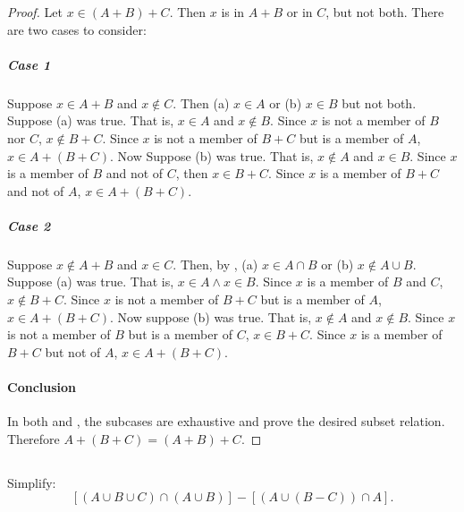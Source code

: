 \documentclass{report}
\begin{document}
\begin{proof}
    Let $x \in (A + B) + C$.
    Then $x$ is in $A + B$ or in $C$, but not both.
    There are two cases to consider:

    \subparagraph{Case 1}%

      Suppose $x \in A + B$ and $x \not\in C$.
      Then (a) $x \in A$ or (b) $x \in B$ but not both.
      Suppose (a) was true.
      That is, $x \in A$ and $x \not\in B$.
      Since $x$ is not a member of $B$ nor $C$, $x \not\in B + C$.
      Since $x$ is not a member of $B + C$ but is a member of $A$,
        $x \in A + (B + C)$.
      Now Suppose (b) was true.
      That is, $x \not\in A$ and $x \in B$.
      Since $x$ is a member of $B$ and not of $C$, then $x \in B + C$.
      Since $x$ is a member of $B + C$ and not of $A$, $x \in A + (B + C)$.

    \subparagraph{Case 2}%

      Suppose $x \not\in A + B$ and $x \in C$.
      Then, by ,
        (a) $x \in A \cap B$ or (b) $x \not\in A \cup B$.
      Suppose (a) was true.
      That is, $x \in A \land x \in B$.
      Since $x$ is a member of $B$ and $C$, $x \not\in B + C$.
      Since $x$ is not a member of $B + C$ but is a member of $A$,
        $x \in A + (B + C)$.
      Now suppose (b) was true.
      That is, $x \not\in A$ and $x \not\in B$.
      Since $x$ is not a member of $B$ but is a member of $C$, $x \in B + C$.
      Since $x$ is a member of $B + C$ but not of $A$, $x \in A + (B + C)$.

  \paragraph{Conclusion}%

    In both  and ,
      the subcases are exhaustive and prove the desired subset relation.
    Therefore $A + (B + C) = (A + B) + C$.

\end{proof}

\subsection{}%
\label{sub:exercise-2.16}

Simplify:
  $$[(A \cup B \cup C) \cap (A \cup B)] - [(A \cup (B - C)) \cap A].$$
\end{document}
